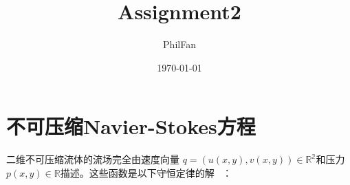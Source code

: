 \documentclass[12pt, a4paper]{article}
\title{Assignment2}
\author{PhilFan}
\date{\today}
\numberwithin{equation}{section} %
\begin{document}
\maketitle
\setcounter{page}{0}
\maketitle
\thispagestyle{empty}



\newpage
{}
\setcounter{page}{1}
\tableofcontents

\newpage
\setcounter{page}{1}
\pagestyle{sectionheader} %

\section{不可压缩Navier-Stokes方程}
\label{sec:a}
二维不可压缩流体的流场完全由速度向量 $q = (u(x, y), v(x, y))\in \mathbb{R^2} $和压力 $p(x, y) \in \mathbb{R} $描述。这些函数是以下守恒定律的解 ~\cite{refa}：
\end{document}
